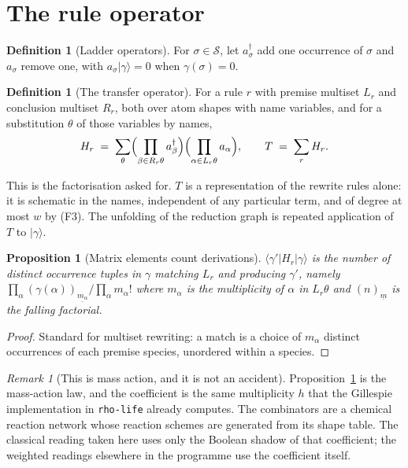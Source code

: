 \documentclass[11pt,a4paper]{article}
\theoremstyle{plain}
\newtheorem{proposition}[theorem]{Proposition}
\theoremstyle{definition}
\newtheorem{definition}[theorem]{Definition}
\theoremstyle{remark}
\newtheorem{remark}[theorem]{Remark}
\newcommand{\Spec}{\mathcal{S}}
\newcommand{\cre}[1]{a^{\dagger}_{#1}}
\newcommand{\ann}[1]{a_{#1}}
\begin{document}
\section{The rule operator}
\label{sec:operator}

\begin{definition}[Ladder operators]
For $\sigma \in \Spec$, let $\cre{\sigma}$ add one occurrence of $\sigma$ and
$\ann{\sigma}$ remove one, with $\ann{\sigma}|\gamma\rangle = 0$ when
$\gamma(\sigma) = 0$.
\end{definition}

\begin{definition}[The transfer operator]
\label{def:T}
For a rule $r$ with premise multiset $L_r$ and conclusion multiset $R_r$, both
over atom shapes with name variables, and for a substitution $\theta$ of those
variables by names,
\[
  H_r \;=\; \sum_{\theta}
  \Bigl(\prod_{\beta \in R_r\theta} \cre{\beta}\Bigr)
  \Bigl(\prod_{\alpha \in L_r\theta} \ann{\alpha}\Bigr),
  \qquad
  T \;=\; \sum_{r} H_r .
\]
\end{definition}

This is the factorisation asked for. $T$ is a representation of the rewrite
rules alone: it is schematic in the names, independent of any particular term,
and of degree at most $w$ by (F3). The unfolding of the reduction graph is
repeated application of $T$ to $|\gamma\rangle$.

\begin{proposition}[Matrix elements count derivations]
\label{prop:counts}
$\langle \gamma' | H_r | \gamma\rangle$ is the number of distinct occurrence
tuples in $\gamma$ matching $L_r$ and producing $\gamma'$, namely
$\prod_{\alpha} (\gamma(\alpha))_{\underline{m_\alpha}}/\prod_\alpha
m_\alpha!$ where $m_\alpha$ is the multiplicity of $\alpha$ in $L_r\theta$ and
$(n)_{\underline{m}}$ is the falling factorial.
\end{proposition}

\begin{proof}
Standard for multiset rewriting: a match is a choice of $m_\alpha$ distinct
occurrences of each premise species, unordered within a species.
\end{proof}

\begin{remark}[This is mass action, and it is not an accident]
Proposition~\ref{prop:counts} is the mass-action law, and the coefficient is
the same multiplicity $h$ that the Gillespie implementation in
\texttt{rho-life} already computes. The combinators are a chemical reaction
network whose reaction schemes are generated from its shape table. The classical reading taken here uses
only the Boolean shadow of that coefficient; the weighted readings elsewhere
in the programme use the coefficient itself.
\end{remark}
\end{document}
